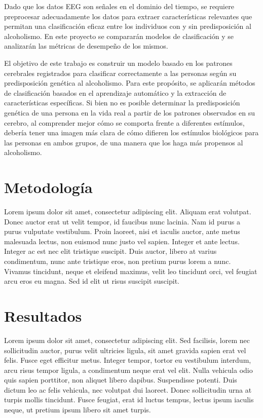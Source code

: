 \documentclass[conference]{IEEEtran}
\begin{document}
Dado que los datos EEG son señales en el dominio del tiempo, se requiere preprocesar adecuadamente los datos para extraer características relevantes que permitan una clasificación eficaz entre los individuos con y sin predisposición al alcoholismo. En este proyecto se compararán modelos de clasificación y se analizarán las métricas de desempeño de los mismos. 

El objetivo de este trabajo es construir un modelo basado en los patrones cerebrales registrados para clasificar correctamente a las personas según su predisposición genética al alcoholismo. Para este propósito, se aplicarán métodos de clasificación basados en el aprendizaje automático y la extracción de características específicas. Si bien no es posible determinar la predisposición genética de una persona en la vida real a partir de los patrones observados en su cerebro, al comprender mejor cómo se comporta frente a diferentes estímulos, debería tener una imagen más clara de cómo difieren los estímulos biológicos para las personas en ambos grupos, de una manera que los haga más propensos al alcoholismo.




\section{Metodología}
Lorem ipsum dolor sit amet, consectetur adipiscing elit. Aliquam erat volutpat. Donec auctor erat ut velit tempor, id faucibus nunc lacinia. Nam id purus a purus vulputate vestibulum. Proin laoreet, nisi et iaculis auctor, ante metus malesuada lectus, non euismod nunc justo vel sapien. Integer et ante lectus. Integer ac est nec elit tristique suscipit. Duis auctor, libero at varius condimentum, nunc ante tristique eros, non pretium purus lorem a nunc. Vivamus tincidunt, neque et eleifend maximus, velit leo tincidunt orci, vel feugiat arcu eros eu magna. Sed id elit ut risus suscipit suscipit.

\section{Resultados}
Lorem ipsum dolor sit amet, consectetur adipiscing elit. Sed facilisis, lorem nec sollicitudin auctor, purus velit ultricies ligula, sit amet gravida sapien erat vel felis. Fusce eget efficitur metus. Integer tempor, tortor eu vestibulum interdum, arcu risus tempor ligula, a condimentum neque erat vel elit. Nulla vehicula odio quis sapien porttitor, non aliquet libero dapibus. Suspendisse potenti. Duis dictum leo ac felis vehicula, nec volutpat dui laoreet. Donec sollicitudin urna at turpis mollis tincidunt. Fusce feugiat, erat id luctus tempus, lectus ipsum iaculis neque, ut pretium ipsum libero sit amet turpis.
\end{document}
